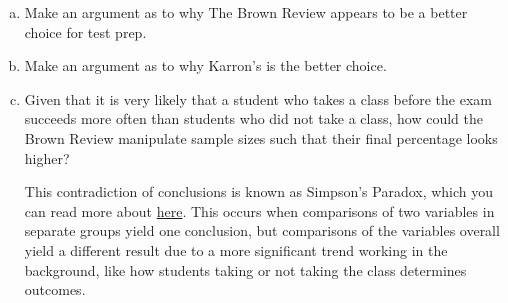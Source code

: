 \documentclass[12pt,letterpaper]{article}
\newif\ifsol
\newcommand{\solu}[2]{ \begin{mdframed} \ifsol #2 \else \vspace{#1} \fi \end{mdframed} }
\begin{document}
    \begin{enumerate}[a.]
    \item Make an argument as to why The Brown Review appears to be a better choice for test prep.\\
    \solu{}{
    \textit{Answer:} The Brown Review has a higher total percentage of success.
    }
   \item Make an argument as to why Karron's is the better choice.\\
   
   \solu{}{
    \textit{Answer:} Given that you are a student who took a statistics class, the chance you succeed with Karron's is higher. This is true eve if you didn't take a statistics class.\\
    
    \textit{Prodding Question:} 
    Let's pretend all students taking the test took a statistics class. Which test-prep book is better? What happens if we asssume all students weren't taking a statistics class?
    }
    
   \item  Given that it is very likely that a student who takes a class before the exam succeeds more often than students who did not take a class, how could the Brown Review manipulate sample sizes such that their final percentage looks higher?\\
   
   \solu{}{
    \textit{Answer:} By letting more of their sample draw from the students that took a statistics class, they are able to get more students that were going to succeed anyways into their sample. This would inflate the number of successes.\\
    
    \textit{Prodding questions:} \begin{itemize}
        \item Look at the denominators of each cell. Does something feel off about The Brown Review's?
        \item  Let's say I have two bags of 10 balls each. The first bag has 8 red balls and the second one has 5 red balls. Which bag would I reach out of if I want to increase the chances of getting a red ball? How does this situation apply if we replace red balls with passing the test and the bags with whether or not a student took the statistics class?
    \end{itemize}
    }
   
   This contradiction of conclusions is known as Simpson's Paradox, which you can read more about \href{https://towardsdatascience.com/simpsons-paradox-how-to-prove-two-opposite-arguments-using-one-dataset-1c9c917f5ff9}{here}. This occurs when comparisons of two variables in separate groups yield one conclusion, but comparisons of the variables overall yield a different result due to a more significant trend working in the background, like how students taking or not taking the class determines outcomes.
   

\end{enumerate}
\end{document}
